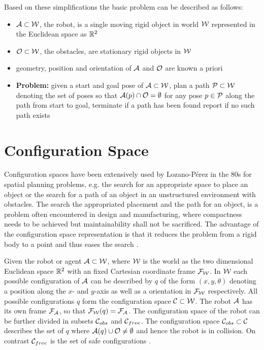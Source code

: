 Based on these simplifications the basic problem can be described as follows:
\begin{itemize}
\item $\mathcal{A} \subset \mathcal{W}$, the robot, is a single moving rigid object in world $\mathcal{W}$ represented in the Euclidean space as $\mathbb{R}^2$
\item $\mathcal{O} \subset \mathcal{W}$, the obstacles, are stationary rigid objects in $\mathcal{W}$
\item geometry, position and orientation of $\mathcal{A}$ and $\mathcal{O}$ are known a priori
\item \textbf{Problem:} given a start and goal pose of $\mathcal{A} \subset \mathcal{W}$, plan a path $\mathcal{P} \subset \mathcal{W}$ denoting the set of poses so that $\mathcal{A}(p) \cap \mathcal{O} = \emptyset$ for any pose  $p \in \mathcal{P}$ along the path from start to goal, terminate if a path has been found report if no such path exists
\end{itemize}

\cite{Latombe.1991} \cite{LaValle.2006}

\section{Configuration Space}
Configuration spaces have been extensively used by Lozano-P\'{e}rez in the 80s for spatial planning problems, e.g. the search for an appropriate space to place an object or the search for a path of an object in an unstructured environment with obstacles. The search the appropriated placement and the path for an object, is a problem often encountered in design and manufacturing, where compactness needs to be achieved but maintainability shall not be sacrificed. The advantage of the configuration space representation is that it reduces the problem from a rigid body to a point and thus eases the search \cite{LozanoPerez.1983}.

Given the robot or agent $\mathcal{A} \subset \mathcal{W}$, where $\mathcal{W}$ is the world as the two dimensional Euclidean space $\mathbb{R}^2$ with an fixed Cartesian coordinate frame $\mathcal{F}_{\mathcal{W}}$. In $\mathcal{W}$ each possible configuration of $\mathcal{A}$ can be described by $q$ of the form $(x,y,\theta)$ denoting a position along the $x$- and $y$-axis as well as a orientation in $\mathcal{F}_{\mathcal{W}}$ respectively. All possible configurations $q$ form the configuration space $\mathcal{C} \subset \mathcal{W}$. The robot $\mathcal{A}$ has its own frame $\mathcal{F}_{\mathcal{A}}$, so that $\mathcal{F}_{\mathcal{W}}(q) = \mathcal{F}_{\mathcal{A}}$. The configuration space of the robot can be further divided in subsets $\mathcal{C}_{obs}$ and $\mathcal{C}_{free}$. The configuration space $\mathcal{C}_{obs} \subset \mathcal{C}$ describes the set of $q$ where $\mathcal{A}(q) \cup \mathcal{O} \neq \emptyset$ and hence the robot is in collision. On contrast $\mathcal{C}_{free}$ is the set of safe configurations \cite{Latombe.1991} \cite{LaValle.2006}.

